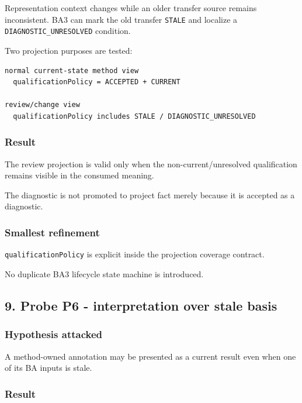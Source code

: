 \documentclass[11pt,a4paper]{article}
\begin{document}
Representation context changes while an older transfer source remains
inconsistent. BA3 can mark the old transfer \texttt{STALE} and localize
a \texttt{DIAGNOSTIC\_UNRESOLVED} condition.

Two projection purposes are tested:

\begin{verbatim}
normal current-state method view
  qualificationPolicy = ACCEPTED + CURRENT

review/change view
  qualificationPolicy includes STALE / DIAGNOSTIC_UNRESOLVED
\end{verbatim}

\subsubsection{Result}\label{result-4}

The review projection is valid only when the non-current/unresolved
qualification remains visible in the consumed meaning.

The diagnostic is not promoted to project fact merely because it is
accepted as a diagnostic.

\subsubsection{Smallest refinement}\label{smallest-refinement-1}

\texttt{qualificationPolicy} is explicit inside the projection coverage
contract.

No duplicate BA3 lifecycle state machine is introduced.

\subsection{9. Probe P6 - interpretation over stale
basis}\label{9-probe-p6---interpretation-over-stale-basis}

\subsubsection{Hypothesis attacked}\label{hypothesis-attacked-5}

A method-owned annotation may be presented as a current result even when
one of its BA inputs is stale.

\subsubsection{Result}\label{result-5}
\end{document}
